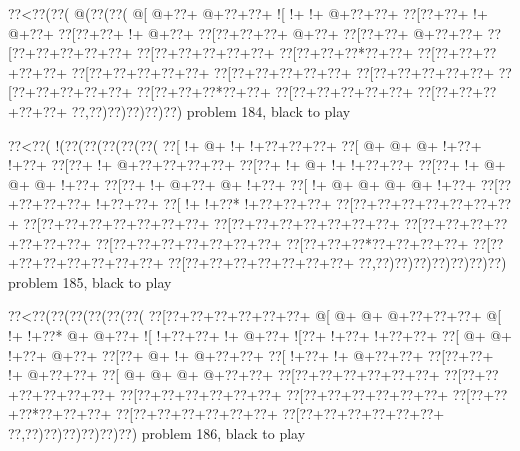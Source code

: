 \vbox{\vbox{\goo
\0??<\0??(\0??(\- @(\0??(\0??(
\- @[\- @+\0??+\- @+\0??+\0??+
\- ![\- !+\- !+\- @+\0??+\0??+
\0??[\0??+\0??+\- !+\- @+\0??+
\0??[\0??+\0??+\- !+\- @+\0??+
\0??[\0??+\0??+\0??+\- @+\0??+
\0??[\0??+\0??+\- @+\0??+\0??+
\0??[\0??+\0??+\0??+\0??+\0??+
\0??[\0??+\0??+\0??+\0??+\0??+
\0??[\0??+\0??+\0??*\0??+\0??+
\0??[\0??+\0??+\0??+\0??+\0??+
\0??[\0??+\0??+\0??+\0??+\0??+
\0??[\0??+\0??+\0??+\0??+\0??+
\0??[\0??+\0??+\0??+\0??+\0??+
\0??[\0??+\0??+\0??+\0??+\0??+
\0??[\0??+\0??+\0??*\0??+\0??+
\0??[\0??+\0??+\0??+\0??+\0??+
\0??[\0??+\0??+\0??+\0??+\0??+
\0??,\0??)\0??)\0??)\0??)\0??)
}
\hfil problem 184, black to play\hfil\break
}

\vbox{\vbox{\goo
\0??<\0??(\- !(\0??(\0??(\0??(\0??(\0??(
\0??[\- !+\- @+\- !+\- !+\0??+\0??+\0??+
\0??[\- @+\- @+\- @+\- !+\0??+\- !+\0??+
\0??[\0??+\- !+\- @+\0??+\0??+\0??+\0??+
\0??[\0??+\- !+\- @+\- !+\- !+\0??+\0??+
\0??[\0??+\- !+\- @+\- @+\- @+\- !+\0??+
\0??[\0??+\- !+\- @+\0??+\- @+\- !+\0??+
\0??[\- !+\- @+\- @+\- @+\- @+\- !+\0??+
\0??[\0??+\0??+\0??+\0??+\- !+\0??+\0??+
\0??[\- !+\- !+\0??*\- !+\0??+\0??+\0??+
\0??[\0??+\0??+\0??+\0??+\0??+\0??+\0??+
\0??[\0??+\0??+\0??+\0??+\0??+\0??+\0??+
\0??[\0??+\0??+\0??+\0??+\0??+\0??+\0??+
\0??[\0??+\0??+\0??+\0??+\0??+\0??+\0??+
\0??[\0??+\0??+\0??+\0??+\0??+\0??+\0??+
\0??[\0??+\0??+\0??*\0??+\0??+\0??+\0??+
\0??[\0??+\0??+\0??+\0??+\0??+\0??+\0??+
\0??[\0??+\0??+\0??+\0??+\0??+\0??+\0??+
\0??,\0??)\0??)\0??)\0??)\0??)\0??)\0??)
}
\hfil problem 185, black to play\hfil\break
}

\vbox{\vbox{\goo
\0??<\0??(\0??(\0??(\0??(\0??(\0??(
\0??[\0??+\0??+\0??+\0??+\0??+\0??+
\- @[\- @+\- @+\- @+\0??+\0??+\0??+
\- @[\- !+\- !+\0??*\- @+\- @+\0??+
\- ![\- !+\0??+\0??+\- !+\- @+\0??+
\- ![\0??+\- !+\0??+\- !+\0??+\0??+
\0??[\- @+\- @+\- !+\0??+\- @+\0??+
\0??[\0??+\- @+\- !+\- @+\0??+\0??+
\0??[\- !+\0??+\- !+\- @+\0??+\0??+
\0??[\0??+\0??+\- !+\- @+\0??+\0??+
\0??[\- @+\- @+\- @+\- @+\0??+\0??+
\0??[\0??+\0??+\0??+\0??+\0??+\0??+
\0??[\0??+\0??+\0??+\0??+\0??+\0??+
\0??[\0??+\0??+\0??+\0??+\0??+\0??+
\0??[\0??+\0??+\0??+\0??+\0??+\0??+
\0??[\0??+\0??+\0??*\0??+\0??+\0??+
\0??[\0??+\0??+\0??+\0??+\0??+\0??+
\0??[\0??+\0??+\0??+\0??+\0??+\0??+
\0??,\0??)\0??)\0??)\0??)\0??)\0??)
}
\hfil problem 186, black to play\hfil\break
}

